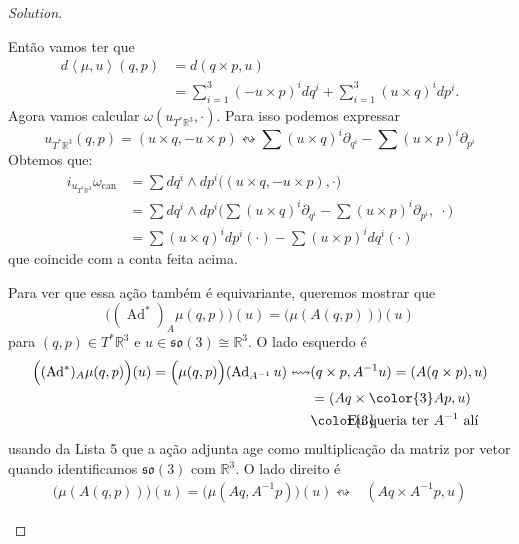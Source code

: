 \begin{proof}[Solution]
\begin{enumerate}[label=\alph*.]
Então vamos ter que
\begin{align*}
d\left<\mu,u\right>(q,p)&=d(q \times p,u)\\
&=\sum_{i=1}^3(-u \times p)^i dq^i +\sum_{i=1}^3 (u \times q)^i dp^i.
\end{align*}\iffalse
\begin{align*}
d\left<\mu,u\right>(q,p)&=d(q \times p,u)\\
&=\Big(d(q\times p),u\Big)+\cancelto{0}{(q \times p,du)}\\
&=(dq\times p,u)+(q\times dp,u)\\
&=(p\times u,dq)+(u\times q,dp)\\
&=(-u\times p,dq)+(u\times q,dp)
\end{align*}\fi
Agora vamos calcular $\omega(u_{T^*\mathbb{R}^3},\cdot)$. Para isso podemos expressar
\[u_{T^*\mathbb{R}^3}(q,p)=(u\times q,-u\times p)\leftrightsquigarrow  \sum (u \times q)^i\partial_{q^i}-\sum (u \times p)^i\partial_{p^i}\]
Obtemos que:\begin{align*}
	i_{u_{T^*\mathbb{R}^3}}\omega_{\operatorname{can}}&=\sum dq^i\wedge dp^i\Big((u\times q,-u\times p),\cdot\Big)\\
	&=\sum dq^i\wedge dp^i\Big(\sum (u \times q)^i\partial_{q^i}-\sum (u \times p)^i\partial_{p^i}, \; \cdot\Big)\\
	&=\sum (u \times q)^i dp^i(\cdot) - \sum (u\times p)^i dq^i(\cdot)
	\end{align*}
	que coincide com a conta feita acima.

Para ver que essa ação também é equivariante, queremos mostrar que
\[\Big((\operatorname{Ad}^*)_A\mu(q,p)\Big)(u)=\Big(\mu(A(q,p))\Big)(u)\]
para $(q,p)\in T^*\mathbb{R}^3$ e $u\in \mathfrak{so}(3) \cong \mathbb{R}^3$. O lado esquerdo é
\begin{align*}
	\Big((\operatorname{Ad}^*)_A\mu(q,p)\Big)(u)=\Big(\mu(q,p)\Big)(\operatorname{Ad}_{A^{-1}}u)\leftrightsquigarrow &(q\times p, A^{-1}u)=(A(q\times p),u ) \\&=(Aq \times {\color{3}Ap}, u)\\ &\text{{\color{3}\hspace{-2em}Eu queria ter $A^{-1}$ alí}} 
\end{align*}
usando da Lista 5 que a ação adjunta age como multiplicação da matriz por vetor quando identificamos $\mathfrak{so}(3)$ com $\mathbb{R}^3$. O lado direito é
\begin{align*}
\Big(\mu(A(q,p))\Big)(u)=\Big(\mu(Aq,A^{-1}p)\Big)(u)\leftrightsquigarrow&(Aq \times A^{-1}p,u)
\end{align*}





\end{enumerate}
\end{proof}

